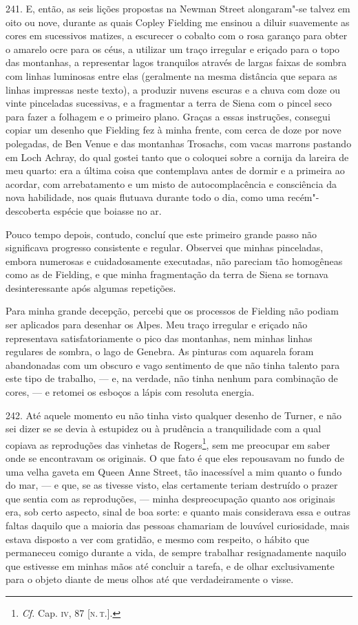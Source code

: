 241. E, então, as seis lições propostas na Newman Street alongaram"-se
talvez em oito ou nove, durante as quais Copley Fielding me ensinou a
diluir suavemente as cores em sucessivos matizes, a escurecer o cobalto
com o rosa garanço para obter o amarelo ocre para os céus, a utilizar um
traço irregular e eriçado para o topo das montanhas, a representar lagos
tranquilos através de largas faixas de sombra com linhas luminosas entre
elas (geralmente na mesma distância que separa as linhas impressas neste
texto), a produzir nuvens escuras e a chuva com doze ou vinte pinceladas
sucessivas, e a fragmentar a terra de Siena com o pincel seco para fazer
a folhagem e o primeiro plano. Graças a essas instruções, consegui
copiar um desenho que Fielding fez à minha frente, com cerca de doze por
nove polegadas, de Ben Venue e das montanhas Trosachs, com vacas marrons
pastando em Loch Achray, do qual gostei tanto que o coloquei sobre a
cornija da lareira de meu quarto: era a última coisa que contemplava
antes de dormir e a primeira ao acordar, com arrebatamento e um misto de
autocomplacência e consciência da nova habilidade, nos quais flutuava
durante todo o dia, como uma recém"-descoberta espécie que boiasse no ar.

Pouco tempo depois, contudo, concluí que este primeiro grande passo não
significava progresso consistente e regular. Observei que minhas
pinceladas, embora numerosas e cuidadosamente executadas, não pareciam
tão homogêneas como as de Fielding, e que minha fragmentação da terra de
Siena se tornava desinteressante após algumas repetições.

Para minha grande decepção, percebi que os processos de Fielding não
podiam ser aplicados para desenhar os Alpes. Meu traço irregular e
eriçado não representava satisfatoriamente o pico das montanhas, nem
minhas linhas regulares de sombra, o lago de Genebra. As pinturas com
aquarela foram abandonadas com um obscuro e vago sentimento de que não
tinha talento para este tipo de trabalho, --- e, na verdade, não tinha
nenhum para combinação de cores, --- e retomei os esboços a lápis com
resoluta energia.

242. Até aquele momento eu não tinha visto qualquer desenho de Turner, e
não sei dizer se se devia à estupidez ou à prudência a tranquilidade com
a qual copiava as reproduções das vinhetas de Rogers\footnote{\emph{Cf.}
  Cap. \textsc{iv}, 87 {[}\textsc{n.\,t.}{]}.}, sem me preocupar em saber onde se
encontravam os originais. O que fato é que eles repousavam no fundo de
uma velha gaveta em Queen Anne Street, tão inacessível a mim quanto o
fundo do mar, --- e que, se as tivesse visto, elas certamente teriam
destruído o prazer que sentia com as reproduções, --- minha
despreocupação quanto aos originais era, sob certo aspecto, sinal de boa
sorte: e quanto mais considerava essa e outras faltas daquilo que a
maioria das pessoas chamariam de louvável curiosidade, mais estava
disposto a ver com gratidão, e mesmo com respeito, o hábito que
permaneceu comigo durante a vida, de sempre trabalhar resignadamente
naquilo que estivesse em minhas mãos até concluir a tarefa, e de olhar
exclusivamente para o objeto diante de meus olhos até que
verdadeiramente o visse.

